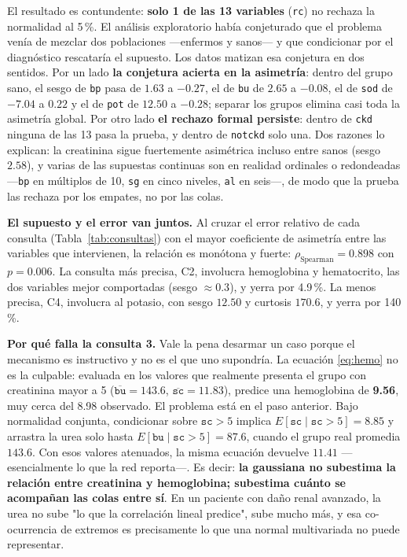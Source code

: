 \documentclass[11pt, a4paper]{article}
\begin{document}
El resultado es contundente: \textbf{solo 1 de las 13 variables} (\texttt{rc}) no rechaza la
normalidad al 5\,\%. El análisis exploratorio había conjeturado que el problema venía de mezclar
dos poblaciones —enfermos y sanos— y que condicionar por el diagnóstico rescataría el supuesto.
Los datos matizan esa conjetura en dos sentidos. Por un lado \textbf{la conjetura acierta en la
asimetría}: dentro del grupo sano, el sesgo de \texttt{bp} pasa de $1.63$ a $-0.27$, el de
\texttt{bu} de $2.65$ a $-0.08$, el de \texttt{sod} de $-7.04$ a $0.22$ y el de \texttt{pot} de
$12.50$ a $-0.28$; separar los grupos elimina casi toda la asimetría global. Por otro lado
\textbf{el rechazo formal persiste}: dentro de \texttt{ckd} ninguna de las 13 pasa la prueba, y
dentro de \texttt{notckd} solo una. Dos razones lo explican: la creatinina sigue fuertemente
asimétrica incluso entre sanos (sesgo $2.58$), y varias de las supuestas continuas son en realidad
ordinales o redondeadas —\texttt{bp} en múltiplos de 10, \texttt{sg} en cinco niveles, \texttt{al}
en seis—, de modo que la prueba las rechaza por los empates, no por las colas.

\textbf{El supuesto y el error van juntos.} Al cruzar el error relativo de cada consulta
(Tabla~\ref{tab:consultas}) con el mayor coeficiente de asimetría entre las variables que
intervienen, la relación es monótona y fuerte: $\rho_{\text{Spearman}} = 0.898$ con $p = 0.006$.
La consulta más precisa, C2, involucra hemoglobina y hematocrito, las dos variables mejor
comportadas (sesgo $\approx 0.3$), y yerra por 4.9\,\%. La menos precisa, C4, involucra al potasio,
con sesgo $12.50$ y curtosis $170.6$, y yerra por 140\,\%.

\textbf{Por qué falla la consulta 3.} Vale la pena desarmar un caso porque el mecanismo es
instructivo y no es el que uno supondría. La ecuación \eqref{eq:hemo} no es la culpable: evaluada
en los valores que realmente presenta el grupo con creatinina mayor a 5
($\overline{\texttt{bu}} = 143.6$, $\overline{\texttt{sc}} = 11.83$), predice una hemoglobina de
\textbf{9.56}, muy cerca del 8.98 observado. El problema está en el paso anterior. Bajo normalidad
conjunta, condicionar sobre $\texttt{sc} > 5$ implica
$E[\texttt{sc} \mid \texttt{sc} > 5] = 8.85$ y arrastra la urea solo hasta
$E[\texttt{bu} \mid \texttt{sc} > 5] = 87.6$, cuando el grupo real promedia $143.6$. Con esos
valores atenuados, la misma ecuación devuelve $11.41$ —esencialmente lo que la red reporta—. Es
decir: \textbf{la gaussiana no subestima la relación entre creatinina y hemoglobina; subestima
cuánto se acompañan las colas entre sí}. En un paciente con daño renal avanzado, la urea no sube
"lo que la correlación lineal predice", sube mucho más, y esa co-ocurrencia de extremos es
precisamente lo que una normal multivariada no puede representar.
\end{document}
